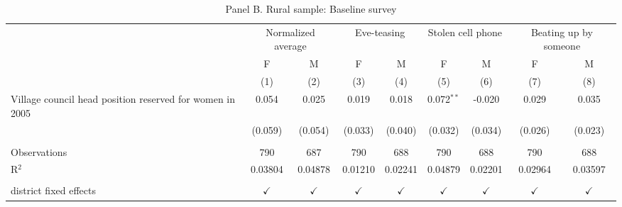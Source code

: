 \begin{table}[htbp]
   \caption{Panel B. Rural sample: Baseline survey}
   \bigskip
   \centering
   \begin{tabular}{lcccccccc}
      \toprule
       & \multicolumn{2}{c}{Normalized average} & \multicolumn{2}{c}{Eve-teasing} & \multicolumn{2}{c}{Stolen cell phone} & \multicolumn{2}{c}{Beating up by someone}\\
                                                                & F             & M             & F             & M             & F             & M             & F             & M \\   
                                                                & (1)           & (2)           & (3)           & (4)           & (5)           & (6)           & (7)           & (8)\\  
      \midrule 
       Village council head position reserved for women in 2005 & 0.054         & 0.025         & 0.019         & 0.018         & 0.072$^{**}$  & -0.020        & 0.029         & 0.035\\   
                                                                & (0.059)       & (0.054)       & (0.033)       & (0.040)       & (0.032)       & (0.034)       & (0.026)       & (0.023)\\   
       \\
      Observations                                              & 790           & 687           & 790           & 688           & 790           & 688           & 790           & 688\\  
      R$^2$                                                     & 0.03804       & 0.04878       & 0.01210       & 0.02241       & 0.04879       & 0.02201       & 0.02964       & 0.03597\\  
       \\
      district fixed effects                                    & $\checkmark$  & $\checkmark$  & $\checkmark$  & $\checkmark$  & $\checkmark$  & $\checkmark$  & $\checkmark$  & $\checkmark$\\   
      \bottomrule
   \end{tabular}
\end{table}



